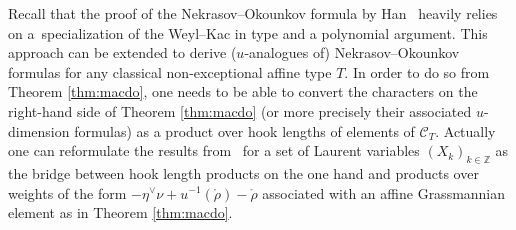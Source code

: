 \documentclass[pdftex]{sigma}
\numberwithin{equation}{section}
\newcommand{\cC}{\mathcal{C}}
\newcommand{\Z}{\mathbb{Z}}
\begin{document}
Recall that the proof of the Nekrasov--Okounkov formula by Han~\cite{Han08} heavily relies on a~specialization of the Weyl--Kac in type  and a polynomial argument. This approach can be extended to derive ($u$-analogues of) Nekrasov--Okounkov formulas for any classical non-exceptional affine type $T$. In order to do so from Theorem \ref{thm:macdo}, one needs to be able to convert the characters on the right-hand side of Theorem \ref{thm:macdo} (or more precisely their associated $u$-dimension formulas) as a product over hook lengths of elements of $\cC_T$. Actually one can reformulate the results from~\cite[Section $4.2$]{Wmac} for a set of Laurent variables $(X_k)_{k\in \Z}$ as the bridge between hook length products on the one hand and products over weights of the form $-\eta ^{\vee }\nu +u^{-1}(\mathring{\rho})-\mathring{\rho}$ associated with an affine Grassmannian element as in Theorem \ref{thm:macdo}.
\end{document}
